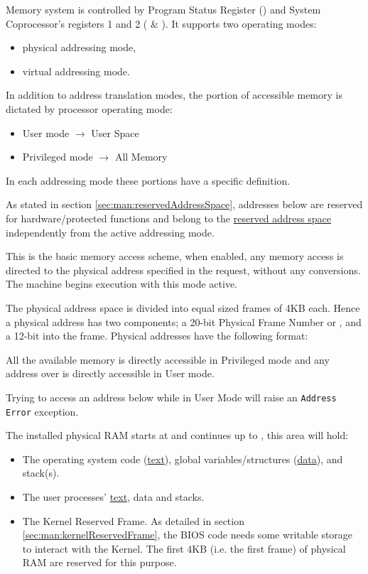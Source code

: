 \label{sec:man:memory}
Memory system is controlled by Program Status Register () and System Coprocessor's registers 1 and 2 ( \& ). It supports two operating modes:

\begin{itemize}
\item physical addressing mode, 
\item virtual addressing mode.
\end{itemize}

In addition to address translation modes, the portion of accessible memory is dictated by processor operating mode:

\begin{itemize}
\item User mode $\rightarrow$ User Space
\item Privileged mode $\rightarrow$ All Memory
\end{itemize}

In each addressing mode these portions have a specific definition.

As stated in section \ref{sec:man:reservedAddressSpace}, addresses below  are reserved for hardware/protected functions and belong to the \uline{reserved address space} independently from the active addressing mode.

This is the basic memory access scheme, when enabled, any memory access is directed to the physical address specified in the request, without any conversions.
The machine begins execution with this mode active.

The physical address space is divided into equal sized frames of 4KB each. 
Hence a physical address has two components; a 20-bit Physical Frame Number or , and a 12-bit  into the frame. 
Physical addresses have the following format:


All the available memory is directly accessible in Privileged mode and any address over  is directly accessible in User mode.


Trying to access an address below  while in User Mode will raise an \texttt{Address Error} exception.

The installed physical RAM starts at  and continues up to , this area will hold:
\begin{itemize}
	\item The operating system code (\uline{text}), global variables/structures (\uline{data}), and stack(s).
	\item The user processes’ \uline{text}, data and stacks.
	\item The Kernel Reserved Frame. 
		As detailed in section \ref{sec:man:kernelReservedFrame}, the BIOS code needs some writable storage to interact with the Kernel. 
		The first 4KB (i.e. the first frame) of physical RAM are reserved for this purpose.
\end{itemize}

